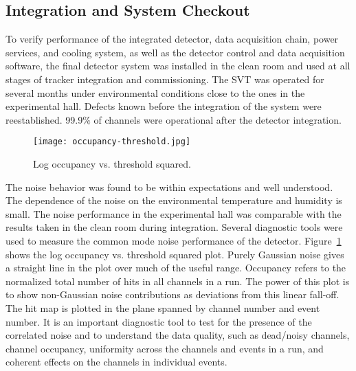 %
%

%

\subsection{Integration and System Checkout}

To verify performance of the integrated detector, data acquisition chain, power services, and cooling system, as well as the detector control and data acquisition software, the final detector system was installed in the clean room and used at all stages of tracker integration and commissioning. The SVT was operated for several months under environmental conditions close to the ones in the experimental hall. Defects known before the integration of the system were reestablished. 99.9$\%$ of channels were operational after the detector integration. 
 
\begin{figure}[hbt] 
\centering 
\texttt{[image: occupancy-threshold.jpg]}
\caption{Log occupancy vs. threshold squared.}
\label{fig:occupancy-threshold}
\end{figure}

The noise behavior was found to be within expectations and well understood. The dependence of the noise on the environmental temperature and humidity is small. The noise performance in the experimental hall was comparable with the results taken in the clean room during integration. Several diagnostic tools were used to measure the common mode noise performance of the detector. Figure~\ref{fig:occupancy-threshold} shows the log occupancy vs. threshold squared plot. Purely Gaussian noise gives a straight line in the plot over much of the useful range. Occupancy refers to the normalized total number of hits in all channels in a run. The power of this plot is to show non-Gaussian noise contributions as deviations from this linear fall-off. The hit map is plotted in the plane spanned by channel number and event number. It is an important diagnostic tool to test for the presence of the correlated noise and to understand the data quality, such as dead/noisy channels, channel occupancy, uniformity across the channels and events in a run, and coherent effects on the channels in individual events.

